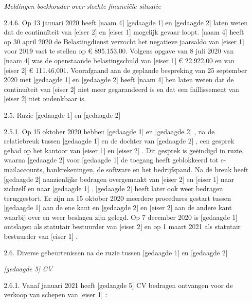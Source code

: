 \documentclass[
  dutch,
  a4paper,
]{article}
\begin{document}
\emph{Meldingen boekhouder over slechte financiële situatie}

2.4.6. Op 13 januari 2020 heeft {[}naam 4{]} {[}gedaagde 1{]} en {[}gedaagde 2{]} laten weten dat de continuïteit van {[}eiser 2{]} en {[}eiser 1{]} mogelijk gevaar loopt. {[}naam 4{]} heeft op 30 april 2020 de Belastingdienst verzocht het negatieve jaarsaldo van {[}eiser 1{]} voor 2019 vast te stellen op € 895.153,00. Volgens opgave van 8 juli 2020 van {[}naam 4{]} was de openstaande belastingschuld van {[}eiser 1{]} € 22.922,00 en van {[}eiser 2{]} € 111.46,001. Voorafgaand aan de geplande bespreking van 25 september 2020 met {[}gedaagde 1{]} en {[}gedaagde 2{]} heeft {[}naam 4{]} hen laten weten dat de continuïteit van {[}eiser 2{]} niet meer gegarandeerd is en dat een faillissement van {[}eiser 2{]} niet ondenkbaar is.

2.5. Ruzie {[}gedaagde 1{]} en {[}gedaagde 2{]}

2.5.1. Op 15 oktober 2020 hebben {[}gedaagde 1{]} en {[}gedaagde 2{]} , na de relatiebreuk tussen {[}gedaagde 1{]} en de dochter van {[}gedaagde 2{]} , een gesprek gehad op het kantoor van {[}eiser 1{]} en {[}eiser 2{]} . Dit gesprek is geëindigd in ruzie, waarna {[}gedaagde 2{]} voor {[}gedaagde 1{]} de toegang heeft geblokkeerd tot e-mailaccounts, bankrekeningen, de software en het bedrijfspand. Na de breuk heeft {[}gedaagde 2{]} aanzienlijke bedragen overgemaakt van {[}eiser 2{]} en {[}eiser 1{]} naar zichzelf en naar {[}gedaagde 1{]} . {[}gedaagde 2{]} heeft later ook weer bedragen teruggestort. Er zijn na 15 oktober 2020 meerdere procedures gestart tussen {[}gedaagde 1{]} aan de ene kant en {[}gedaagde 2{]} en {[}eiser 2{]} aan de andere kant waarbij over en weer beslagen zijn gelegd. Op 7 december 2020 is {[}gedaagde 1{]} ontslagen als statutair bestuurder van {[}eiser 2{]} en op 1 maart 2021 als statutair bestuurder van {[}eiser 1{]} .

2.6. Diverse gebeurtenissen na de ruzie tussen {[}gedaagde 1{]} en {[}gedaagde 2{]}

\emph{{[}gedaagde 5{]} CV}

2.6.1. Vanaf januari 2021 heeft {[}gedaagde 5{]} CV bedragen ontvangen voor de verkoop van schepen van {[}eiser 1{]} :
\end{document}

